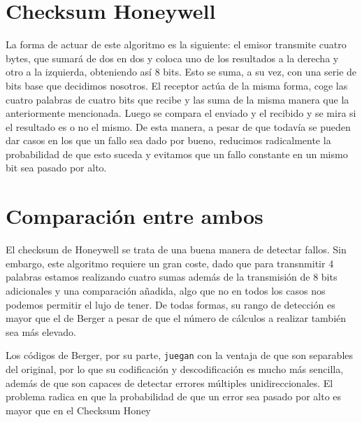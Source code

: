 \documentclass[a4paper]{article}
\begin{document}
\section{Checksum Honeywell}

	La forma de actuar de este algoritmo es la siguiente: el emisor transmite cuatro bytes, que sumará de dos en dos y coloca uno de los resultados a la derecha y otro a la izquierda, obteniendo así 8 bits. Esto se suma, a su vez, con una serie de bits base que decidimos nosotros.
	El receptor actúa de la misma forma, coge las cuatro palabras de cuatro bits que recibe y las suma de la misma manera que la anteriormente mencionada. Luego se compara el enviado y el recibido y se mira si el resultado es o no el mismo. De esta manera, a pesar de que todavía se pueden dar casos en los que un fallo sea dado por bueno, reducimos radicalmente la probabilidad de que esto suceda y evitamos que un fallo constante en un mismo bit sea pasado por alto.
	
\section{Comparación entre ambos}

El checksum de Honeywell se trata de una buena manera de detectar fallos. Sin embargo, este algoritmo requiere un gran coste, dado que para transnmitir 4 palabras estamos realizando cuatro sumas además de la transmisión de 8 bits adicionales y una comparación añadida, algo que no en todos los casos nos podemos permitir el lujo de tener.
	De todas formas, su rango de detección es mayor que el de Berger a pesar de que el número de cálculos a realizar también sea más elevado.

Los códigos de Berger, por su parte, \texttt{juegan} con la ventaja de que son separables del original, por lo que su codificación y descodificación es mucho más sencilla, además de que son capaces de detectar errores múltiples unidireccionales. El problema radica en que la probabilidad de que un error sea pasado por alto es mayor que en el Checksum Honey 
	
\end{document}
